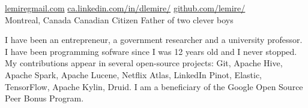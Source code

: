 \documentclass[12pt]{article} %
\begin{document}


\noindent\href{mailto:lemire@gmail.com}{lemire\MVAt{}gmail.com}\bull %
\href{http://ca.linkedin.com/in/dlemire/}{ca.linkedin.com/in/dlemire/} \bull
\href{https://github.com/lemire/}{github.com/lemire/}
\\ %
Montreal, Canada  \bull Canadian Citizen  \bull Father of two clever boys%

\spacedhrule{0.9em}{-0.4em} %



\setlength\columnsep{50pt}



I have been an entrepreneur, a government researcher and a university professor. I have been programming sofware since I was 12 years old and I never stopped. My contributions appear in several open-source projects: Git, Apache Hive, Apache Spark, Apache Lucene, Netflix Atlas, LinkedIn Pinot, Elastic, TensorFlow, Apache Kylin, Druid. I am a beneficiary of the Google Open Source Peer Bonus Program.


\end{document}
